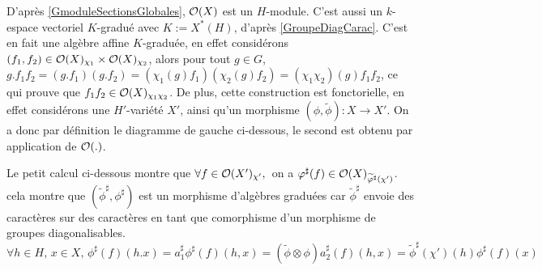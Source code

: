 D'après \ref{GmoduleSectionsGlobales}, $\mathcal{O}(X)$ est un $H$-module. C'est aussi un $k$-espace vectoriel $K$-gradué avec $K:=X^*(H)$, d'après \ref{GroupeDiagCarac}. C'est en fait une algèbre affine $K$-graduée, en effet considérons $(f_1, f_2)\in \mathcal{O}(X)_{\chi_1}\times \mathcal{O}(X)_{\chi_2}$, alors pour tout $g\in G$, $g.f_1f_2=(g.f_1)(g.f_2)=(\chi_1(g)f_1)(\chi_2(g)f_2)=(\chi_1\chi_2)(g)f_1f_2$, ce qui prouve que $f_1f_2\in \mathcal{O}(X)_{\chi_1\chi_2}$. De plus, cette construction est fonctorielle, en effet considérons une $H'$-variété $X'$, ainsi qu'un morphisme $(\phi,\widetilde{\phi}):X\rightarrow X'$. On a donc par définition le diagramme de gauche ci-dessous, le second est obtenu par application de $\mathcal{O}(.)$.

\begin{multicols}{2}
	\begin{center}
	\end{center}

	\columnbreak
	\begin{center}
	\end{center}
\end{multicols}

Le petit calcul ci-dessous montre que $\forall f\in \mathcal{O}(X')_{\chi'},\,$ on a $\varphi^\sharp(f)\in \mathcal{O}(X)_{\widetilde{\varphi}^\sharp(\chi')}$. cela montre que $(\widetilde{\phi}^\sharp,\phi^\sharp)$ est un morphisme d'algèbres graduées car $\widetilde{\phi}^\sharp$ envoie des caractères sur des caractères en tant que comorphisme d'un morphisme de groupes diagonalisables. 
$$\forall h\in H,\,x\in X,\, \phi^\sharp(f)(h.x)=a_1^\sharp\phi^\sharp(f)(h, x)=(\widetilde{\phi}\otimes\phi)a_2^\sharp(f)(h,x)=\widetilde{\phi}^\sharp(\chi')(h)\phi^\sharp(f)(x)$$ 

